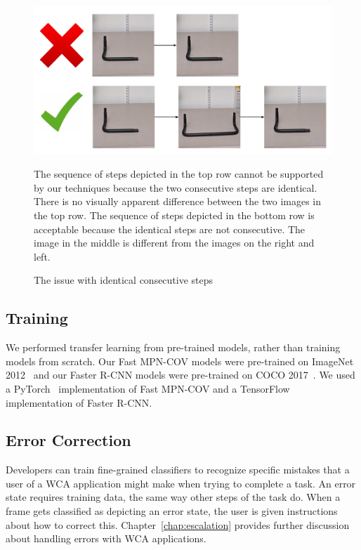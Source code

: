 \begin{figure}
  \includegraphics[width=\columnwidth]{figures/consec_step.pdf}
  \begin{captiontext}
    The sequence of steps depicted in the top row cannot be supported by our
    techniques because the two consecutive steps are identical.
    There is no visually apparent difference between the two images in the top
    row.
    The sequence of steps depicted in the bottom row is acceptable because the
    identical steps are not consecutive.
    The image in the middle is different from the images on the right and left.
  \end{captiontext}
  \caption{
    The issue with identical consecutive steps
  }\label{fig:consec_step}
\end{figure}

\subsection{Training}

We performed transfer learning from pre-trained models, rather than training
models from scratch.
Our Fast MPN-COV models were pre-trained on ImageNet 2012~\cite{ILSVRC15} and
our Faster R-CNN models were pre-trained on COCO 2017~\cite{coco}.
We used a PyTorch~\cite{pytorch} implementation of Fast MPN-COV and a
TensorFlow~\cite{tensorflow2015-whitepaper} implementation of Faster R-CNN.

\subsection{Error Correction}

Developers can train fine-grained classifiers to recognize specific mistakes
that a user of a WCA application might make when trying to complete a task.
An error state requires training data, the same way other steps of the task do.
When a frame gets classified as depicting an error state, the user is given
instructions about how to correct this.
Chapter~\ref{chap:escalation} provides further discussion about handling errors
with WCA applications.

